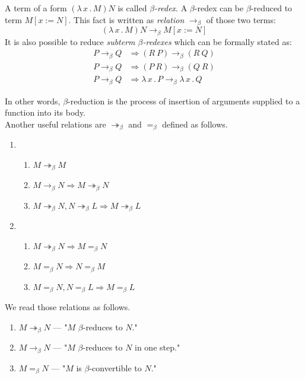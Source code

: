 \documentclass{sig-alternate}
\newcommand{\then}{\Rightarrow\xspace}
\newcommand{\lamb}[2]{( \lambda \, #1 \, . \, #2 )}
\newcommand{\lam}[2]{\lambda \, #1 \, . \, #2}
\newcommand{\bbarr}{\twoheadrightarrow_\beta}
\newcommand{\barr}{\rightarrow_\beta}
\newcommand{\beq}{=_\beta}
\begin{document}
\newcommand{\bRedex}{$\beta$-redex\xspace}
\newcommand{\bRedexes}{$\beta$-redexes\xspace}
\newcommand{\bArrow}{\rightarrow_\beta\xspace}
\newcommand{\eArrow}{\rightarrow_\eta\xspace}
\newcommand{\eeArrow}{\rightarrow_{\eta^{-1}}\xspace}

A term of a form $\lamb{x}{M}N$ is called \textit{\bRedex}.
A \bRedex can be $\beta$-reduced to term $M[x:=N]$. 
This fact is written as \textit{relation} $\bArrow$ 
of those two terms:
\begin{equation} \label{eq:bRed}
\lamb{x}{M}N \bArrow M[x:=N]
\end{equation}
It is also possible to reduce \textit{subterm \bRedexes} 
which can be formally stated as:
\begin{align*}
P \bArrow Q &\then (R~P)      \bArrow (R~Q) \\
P \bArrow Q &\then (P~R)      \bArrow (Q~R) \\
P \bArrow Q &\then \lam{x}{P} \bArrow \lam{x}{Q}  
\end{align*}

In other words, $\beta$-reduction is the process 
of insertion of arguments supplied to a function into 
its body. \\

Another useful relations are $\bbarr$ and $\beq$ defined as follows. 

\begin{enumerate}
 \item \begin{enumerate}
 	\item $M \bbarr M$
 	\item $M \barr N \then M \bbarr N$
 	\item $M \bbarr N , N \bbarr L \then M \bbarr L$ 	
 \end{enumerate}
 \item \begin{enumerate}
 	\item $M \bbarr N \then M \beq N$
 	\item $M \beq N \then N \beq M$
 	\item $M \beq N , N \beq L \then M \beq L$
 \end{enumerate}

\end{enumerate}

We read those relations as follows.
\begin{enumerate}
 	\item $M \bbarr N$ --- "$M$ $\beta$-reduces to $N$."  
 	\item $M \barr N$  --- "$M$ $\beta$-reduces to $N$
 	      in one step."
 	\item $M \beq N$ --- "$M$ is $\beta$-convertible to $N$."	
 \end{enumerate}
\end{document}
